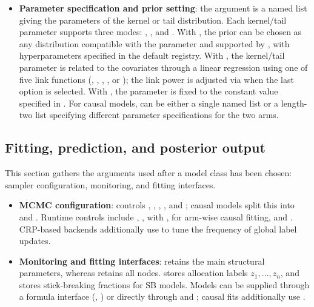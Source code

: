 \documentclass[article]{jss}\usepackage[]{graphicx}\usepackage[]{xcolor}
\begin{document}
\begin{itemize}
\item \textbf{Parameter specification and prior setting}: the argument  is a named list giving the parameters of the kernel or tail distribution. Each kernel/tail parameter supports three modes: , , and . With , the prior can be chosen as any distribution compatible with the parameter and supported by , with hyperparameters specified in the default registry. With , the kernel/tail parameter is related to the covariates through a linear regression using one of five link functions (, , , , or ); the link power is adjusted via  when the last option is selected. With , the parameter is fixed to the constant value specified in . For causal models,  can be either a single named list or a length-two list specifying different parameter specifications for the two arms.
\end{itemize}

\subsection{Fitting, prediction, and posterior output}
\label{subsec:app-fitting}

This section gathers the arguments used after a model class has been chosen: sampler configuration, monitoring, and fitting interfaces.

\begin{itemize}
\item \textbf{MCMC configuration}:  controls , , , , and ; causal models split this into  and . Runtime controls include , ,  with ,  for arm-wise causal fitting, and . CRP-based backends additionally use  to tune the frequency of global label updates.
\item \textbf{Monitoring and fitting interfaces}:  retains the main structural parameters, whereas  retains all nodes.  stores allocation labels $z_1,\ldots,z_n$, and  stores stick-breaking fractions for SB models. Models can be supplied through a formula interface (, ) or directly through  and ; causal fits additionally use .

\end{itemize}
\end{document}
